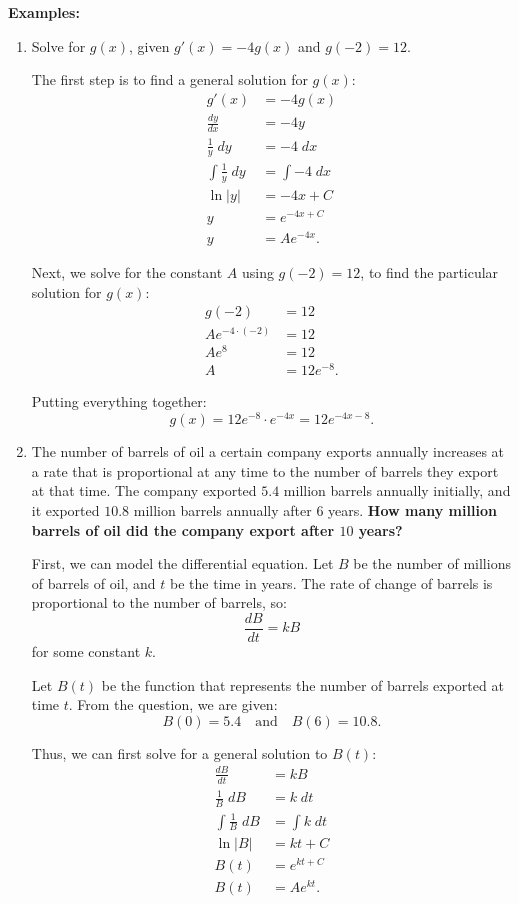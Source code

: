 \documentclass[12pt]{article}
\begin{document}
\noindent \textbf{Examples:}
\begin{enumerate}
	\item Solve for $g(x)$, given $g'(x) = -4 g(x)$ and $g(-2) = 12$.

	The first step is to find a general solution for $g(x)$:
	\begin{align*}
		g'(x) &= -4 g(x) \\
		\frac{dy}{dx} &= -4y \\[5pt]
		\frac{1}{y} \; dy &= -4 \; dx \\[5pt]
		\int \frac{1}{y} \; dy &= \int -4 \; dx \\[5pt]
		\ln |y| &= -4x + C \\
		y &= e^{-4x + C} \\
		y &= A e^{-4x}.
	\end{align*}

	Next, we solve for the constant $A$ using $g(-2) = 12$, to find the particular solution for $g(x)$:
	\begin{align*}
		g(-2) &= 12 \\
		A e^{-4 \cdot (-2)} &= 12 \\
		A e^8 &= 12 \\
		A &= 12 e^{-8}.
	\end{align*}

	Putting everything together:
	\[ g(x) = 12 e^{-8} \cdot e^{-4x} = 12 e^{-4x - 8}. \]

	\item The number of barrels of oil a certain company exports annually increases at a rate that is proportional at any time to the number of barrels they export at that time. The company exported $5.4$ million barrels annually initially, and it exported $10.8$ million barrels annually after $6$ years. \textbf{How many million barrels of oil did the company export after $10$ years?}

	First, we can model the differential equation. Let $B$ be the number of millions of barrels of oil, and $t$ be the time in years. The rate of change of barrels is proportional to the number of barrels, so:
	\[ \frac{dB}{dt} = kB \]
	for some constant $k$.

	Let $B(t)$ be the function that represents the number of barrels exported at time $t$. From the question, we are given:
	\[ B(0) = 5.4 \quad \text{and} \quad B(6) = 10.8. \]

	Thus, we can first solve for a general solution to $B(t)$:
	\begin{align*}
		\frac{dB}{dt} &= kB \\[5pt]
		\frac{1}{B} \; dB &= k \; dt \\[5pt]
		\int \frac{1}{B} \; dB &= \int k \; dt \\[5pt]
		\ln |B| &= kt + C \\
		B(t) &= e^{kt + C} \\
		B(t) &= A e^{kt}.
	\end{align*}


\end{enumerate}
\end{document}
